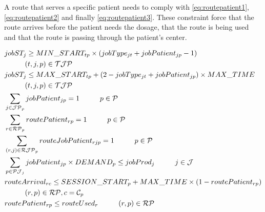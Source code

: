 A route that serves a specific patient needs to comply with \ref{eq:routepatient1}, \ref{eq:routepatient2} and finally \ref{eq:routepatient3}. These constraint force that the route arrives before the patient needs the dosage, that the route is being used and that the route is passing through the patient's center.

\begin{align}           
		& jobST_{j} \ge MIN\_START_{tp} \times (jobType_{jt} + jobPatient_{jp} -1) \notag\\ 
				&	\hspace{10mm} (t, j, p) \in \mathcal{TJP} \label{eq:radio1}\\
		& jobST_{j} \le MAX\_START_{tp} + (2 - jobType_{jt} + jobPatient_{jp}) \times MAX\_TIME \notag\\ 
				& \hspace{10mm} (t, j, p) \in \mathcal{TJP} \label{eq:radio2}\\
		& \sum_{j \in \mathcal{JP}_p} jobPatient_{jp} = 1
				\hspace{10mm} p \in \mathcal{P} \label{eq:auxBinary1}\\
		& \sum_{r \in \mathcal{RP}_p} routePatient_{rp} = 1
				\hspace{10mm} p \in \mathcal{P} \label{eq:auxBinary2}\\
		& \sum_{(r, j) \in \mathcal{RJP}_p} routeJobPatient_{rjp} = 1
				\hspace{10mm} p \in \mathcal{P} \label{eq:auxBinary3}\\
		& \sum_{p \in \mathcal{PJ}_j} jobPatient_{jp} \times DEMAND_{p} \le jobProd_{j}
				\hspace{10mm} j \in \mathcal{J} \label{eq:prodcapacity}\\
		& routeArrival_{rc} \le SESSION\_START_{p} + MAX\_TIME \times (1 - routePatient_{rp}) \notag\\ 
				&	\hspace{10mm} (r, p) \in \mathcal{RP}, c = \mathcal{C}_p \label{eq:routepatient1}\\
		& routePatient_{rp} \le routeUsed_{r}
				\hspace{10mm} (r, p) \in \mathcal{RP} \label{eq:routepatient2}\\

\end{align}
